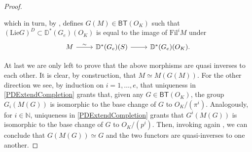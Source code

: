 \begin{proof}
\begin{enumerate}
	which in turn, by \cite[Lemma 2.4.4]{deJong}, defines $G(M) \in \mathsf{BT}(O_K)$
	such that $(\mathrm{Lie}G)^D \subset \mathbb{D}^*(G_e)(O_K)$ is
	equal to the image of $\mathrm{Fil}^iM$ under
	\begin{equation*}
	\begin{tikzcd}
		M \arrow[r, "\sim", rightarrow] &
		\mathbb{D}^*(G_e)(S) \arrow[r, "", rightarrow] &
		\mathbb{D}^*(G_e)(O_K)
	.\end{tikzcd}
	\end{equation*}
\end{enumerate}
At last we are only left to prove that the above morphisms are quasi inverses to each other.
It is clear, by construction, that $M \simeq M(G(M))$.
For the other direction we see, by induction on $i = 1, \ldots, e$, that uniqueness in
\cref{PDExtendCompletion} grants that, given any $G \in \mathsf{BT}(O_K)$, 
the group $G_i(M(G))$ is isomorphic to the base change of $G$ to $O_K/ (\pi^i)$.
Analogously, for $i \in \mathbb{N}$, uniqueness in \cref{PDExtendCompletion} grants
that $G^i(M(G))$ is isomorphic to the base change of $G$ to $O_K/ (p^i)$.
Then, invoking again \cite[Lemma 2.4.4]{deJong}, we can conclude that $G(M(G)) \simeq G$
and the two functors are quasi-inverses to one another.
\end{proof}

